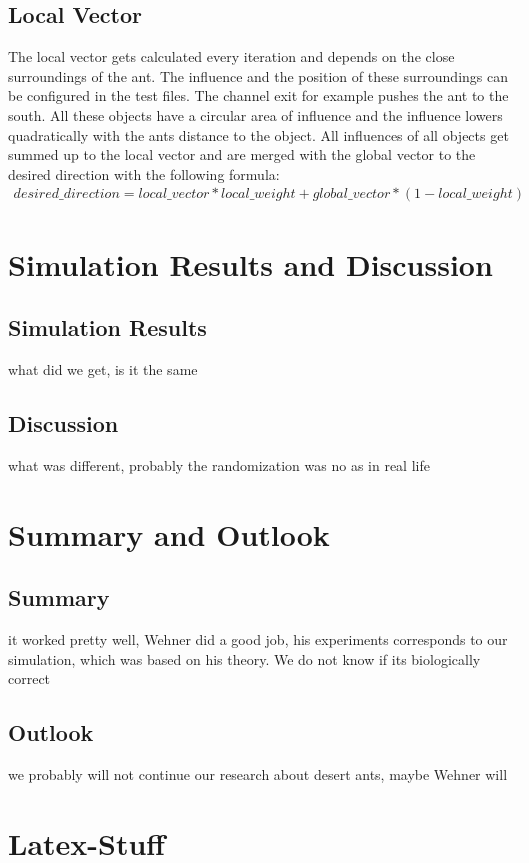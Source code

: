 \documentclass[11pt]{article}
\begin{document}
	\subsection{Local Vector}
		The local vector gets calculated every iteration and depends on the close surroundings of the ant. The influence and the position of these surroundings can be configured in the test files. The channel exit for example pushes the ant to the south. All these objects have a circular area of influence and the influence lowers quadratically with the ants distance to the object. All influences of all objects get summed up to the local vector and are merged with the global vector to the desired direction with the following formula:
		\begin{align*}
			desired\_direction = local\_vector * local\_weight + global\_vector * (1-local\_weight)
		\end{align*}
\section{Simulation Results and Discussion}
	\subsection{Simulation Results} %
		what did we get, is it the same
	\subsection{Discussion}
		what was different, probably the randomization was no as in real life
\section{Summary and Outlook} %
	\subsection{Summary}
		it worked pretty well, Wehner did a good job, his experiments corresponds to our simulation, which was based on his theory. We do not know if its biologically correct
	\subsection{Outlook}
		we probably will not continue our research about desert ants, maybe Wehner will

\section{Latex-Stuff}
\end{document}
